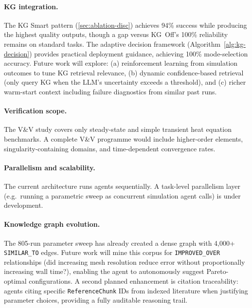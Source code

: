 \documentclass[twocolumn]{article}
\begin{document}
\paragraph{KG integration.}
The KG Smart pattern (\cref{sec:ablation-disc}) achieves 94\% success
while producing the highest quality outputs, though a gap versus
KG~Off's 100\% reliability remains on standard tasks.
The adaptive decision framework (Algorithm~\ref{alg:kg-decision}) provides
practical deployment guidance, achieving 100\% mode-selection accuracy.
Future work will explore:
(a) reinforcement learning from simulation outcomes to tune KG retrieval
relevance, (b) dynamic confidence-based retrieval (only query KG when the
LLM's uncertainty exceeds a threshold), and (c) richer warm-start context
including failure diagnostics from similar past runs.

\paragraph{Verification scope.}
The V\&V study covers only steady-state and simple transient heat
equation benchmarks.  A complete V\&V programme would include
higher-order elements, singularity-containing domains, and
time-dependent convergence rates.

\paragraph{Parallelism and scalability.}
The current architecture runs agents sequentially.  A task-level
parallelism layer (e.g.\ running a parametric sweep as concurrent
simulation agent calls) is under development.

\paragraph{Knowledge graph evolution.}
The 805-run parameter sweep has already created a dense graph with
4{,}000+ \texttt{SIMILAR\_TO} edges.  Future work will mine this corpus
for \texttt{IMPROVED\_OVER} relationships (did increasing mesh resolution
reduce error without proportionally increasing wall time?), enabling the
agent to autonomously suggest Pareto-optimal configurations.  A second
planned enhancement is citation traceability: agents citing specific
\texttt{ReferenceChunk} IDs from indexed literature when justifying
parameter choices, providing a fully auditable reasoning trail.

\end{document}

